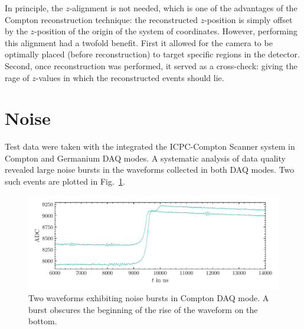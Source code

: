 In principle, the $z$-alignment is not needed, which is one of the advantages of the Compton reconstruction technique: the reconstructed $z$-position is simply offset by the $z$-position of the origin of the system of coordinates. However, performing this alignment had a twofold benefit. First it allowed for the camera to be optimally placed (before reconstruction) to target specific regions in the detector. Second, once reconstruction was performed, it served as a cross-check: giving the rage of $z$-values in which the reconstructed events should lie. 


\section{Noise} \label{sec:noise}
Test data were taken with the integrated the ICPC-Compton Scanner system in Compton and Germanium DAQ modes. A systematic analysis of data quality revealed large noise bursts in the waveforms collected in both DAQ modes. Two such events are plotted in Fig.~\ref{fig:burst_waveforms}. 
\begin{figure}[htb]
    \centering
	\vspace*{-10pt}
    \includegraphics[width=6in]{figs/param/burst_waveforms_6_9in.pdf}
	\vspace*{-10mm}
    \caption{Two waveforms exhibiting noise bursts in Compton DAQ mode. A burst obscures the beginning of the rise of the waveform on the bottom.}
    \label{fig:burst_waveforms}
	\vspace*{-5pt}
\end{figure}

